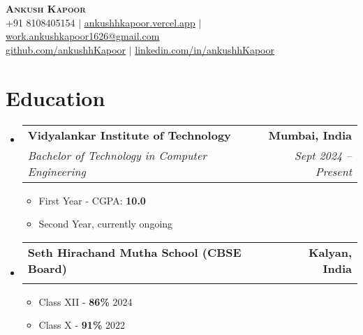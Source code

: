 \documentclass[letterpaper,11pt]{article}
\makeatletter
\newcommand{\resumeItem}[1]{
  \item\small{
    {#1 \vspace{-3pt}}
  }
}
\newcommand{\resumeSubheading}[4]{
  \vspace{-2pt}\item
    \begin{tabular*}{1.0\textwidth}[t]{l@{\extracolsep{\fill}}r}
      \vspace{-2pt}\textbf{#1} & \textbf{\small #2} \\
      \textit{\small#3} & \textit{\small #4} \\
    \end{tabular*}\vspace{-8pt}
} %
\newcommand{\resumeSubHeadingListStart}{\begin{itemize}[leftmargin=0.0in, label={}]}
\newcommand{\resumeSubHeadingListEnd}{\end{itemize}}
\newcommand{\resumeItemListStart}{\begin{itemize}}
\newcommand{\resumeItemListEnd}{\end{itemize}\vspace{-9pt}}
\makeatother
\begin{document}

\begin{center}
    {\huge \scshape \textbf{Ankush Kapoor}} \\ \vspace{1pt}
    \small
    +91 8108405154 $|$  \href{https://ankushhkapoor.vercel.app}{\underline{ankushhkapoor.vercel.app}} $|$
    \href{mailto:work.ankushkapoor1626@gmail.com}{\underline{work.ankushkapoor1626@gmail.com}} \\
    \href{https://github.com/ankushhKapoor}{\underline{github.com/ankushhKapoor}} $|$
    \href{https://linkedin.com/in/ankushhKapoor}{\underline{linkedin.com/in/ankushhKapoor}}    \vspace{-8pt}
\end{center}


\section{Education}
    \resumeSubHeadingListStart
        \resumeSubheading
            {Vidyalankar Institute of Technology}{Mumbai, India}
            {Bachelor of Technology in Computer Engineering}{Sept 2024 -- Present}
            \resumeItemListStart
                \resumeItem{First Year - CGPA: \textbf{10.0}}
                \resumeItem{Second Year, currently ongoing}
            \resumeItemListEnd

        \resumeSubheading
            {Seth Hirachand Mutha School (CBSE Board)}{Kalyan, India}
            {}{}
            \vspace{-16pt}\resumeItemListStart
                \resumeItem{Class XII - \textbf{86\%} \hspace{5.984in} 2024}
                \resumeItem{Class X - \textbf{91\%} \hspace{6.083in} 2022}
            \resumeItemListEnd
    \resumeSubHeadingListEnd
\vspace{-15pt}
\end{document}
